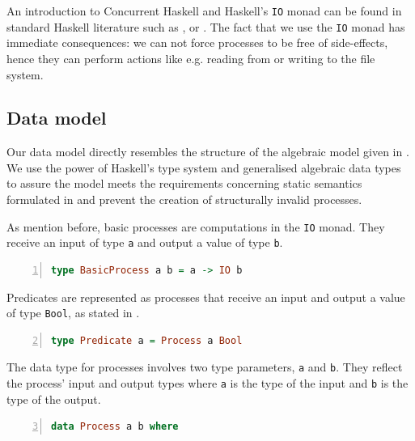 An introduction to \textsf{Concurrent Haskell} and \textsf{Haskell}'s \texttt{IO} monad can be found in standard \textsf{Haskell} literature such as \cite{Hutton}, \cite{Bird} or \cite{Marlow}. The fact that we use the \texttt{IO} monad has immediate consequences: we can not force processes to be free of side-effects, hence they can perform actions like e.g. reading from or writing to the file system.

\subsection{Data model}
\label{chp:local_model}
Our data model directly resembles the structure of the algebraic model given in . We use the power of \textsf{Haskell}'s type system and generalised algebraic data types to assure the model meets the requirements concerning static semantics formulated in  and prevent the creation of structurally invalid processes.

As mention before, basic processes are computations in the \texttt{IO} monad. They receive an input of type \texttt{a} and output a value of type \texttt{b}.
\begin{lstlisting}[language=Haskell,caption=Representation of basic processes as computations in the \texttt{IO} monad.,label=fig:local_computation,numbers=left,frame=bt]
type BasicProcess a b = a -> IO b
\end{lstlisting}

Predicates are represented as processes that receive an input and output a value of type \texttt{Bool}, as stated in .
\begin{lstlisting}[language=Haskell,caption=Representation of predicates as processes.,label=fig:local_computation,numbers=left,frame=bt,firstnumber=2]
type Predicate a = Process a Bool
\end{lstlisting}

The data type for processes involves two type parameters, \texttt{a} and \texttt{b}. They reflect the process' input and output types where \texttt{a} is the type of the input and \texttt{b} is the type of the output.
\begin{lstlisting}[language=Haskell,caption=Data type for the representation of processes.,label=fig:local_datatypes,numbers=left,frame=bt,firstnumber=3]
data Process a b where
\end{lstlisting}

